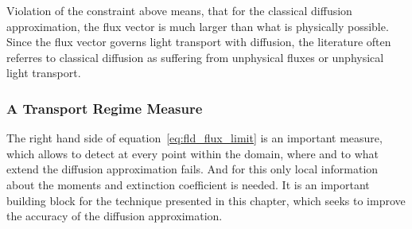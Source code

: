 Violation of the constraint above means, that for the classical diffusion approximation, the flux vector is much larger than what is physically possible. Since the flux vector governs light transport with diffusion, the literature often referres to classical diffusion as suffering from unphysical fluxes or unphysical light transport.


\subsubsection*{A Transport Regime Measure}

The right hand side of equation~\ref{eq:fld_flux_limit} is an important measure, which allows to detect at every point within the domain, where and to what extend the diffusion approximation fails. And for this only local information about the moments and extinction coefficient is needed. It is an important building block for the technique presented in this chapter, which seeks to improve the accuracy of the diffusion approximation.

